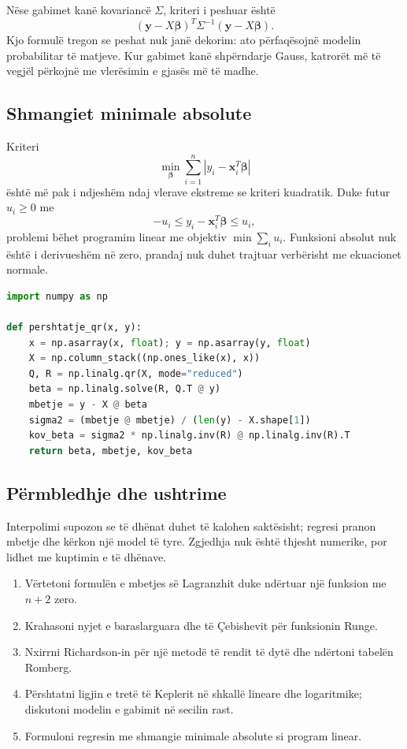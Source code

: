 \documentclass[11pt,oneside,openany]{book}
\newcommand{\vect}[1]{\bm{#1}}
\begin{document}
Nëse gabimet kanë kovariancë $\Sigma$, kriteri i peshuar është
\begin{equation}
 (\vect y-X\vect\beta)^T\Sigma^{-1}(\vect y-X\vect\beta).
\end{equation}
Kjo formulë tregon se peshat nuk janë dekorim: ato përfaqësojnë modelin probabilitar të matjeve. Kur gabimet kanë shpërndarje Gauss, katrorët më të vegjël përkojnë me vlerësimin e gjasës më të madhe.

\subsection{Shmangiet minimale absolute}
Kriteri
\begin{equation}
 \min_{\vect\beta}\sum_{i=1}^{n}|y_i-\vect x_i^T\vect\beta|
\end{equation}
është më pak i ndjeshëm ndaj vlerave ekstreme se kriteri kuadratik. Duke futur $u_i\ge0$ me
\begin{equation}
 -u_i\le y_i-\vect x_i^T\vect\beta\le u_i,
\end{equation}
problemi bëhet programim linear me objektiv $\min\sum_i u_i$. Funksioni absolut nuk është i derivueshëm në zero, prandaj nuk duhet trajtuar verbërisht me ekuacionet normale.

\begin{lstlisting}[language=Python,caption={Përshtatje lineare me QR dhe diagnostikë të mbetjeve.}]
import numpy as np

def pershtatje_qr(x, y):
    x = np.asarray(x, float); y = np.asarray(y, float)
    X = np.column_stack((np.ones_like(x), x))
    Q, R = np.linalg.qr(X, mode="reduced")
    beta = np.linalg.solve(R, Q.T @ y)
    mbetje = y - X @ beta
    sigma2 = (mbetje @ mbetje) / (len(y) - X.shape[1])
    kov_beta = sigma2 * np.linalg.inv(R) @ np.linalg.inv(R).T
    return beta, mbetje, kov_beta
\end{lstlisting}

\subsection{Përmbledhje dhe ushtrime}
Interpolimi supozon se të dhënat duhet të kalohen saktësisht; regresi pranon mbetje dhe kërkon një model të tyre. Zgjedhja nuk është thjesht numerike, por lidhet me kuptimin e të dhënave.
\begin{enumerate}
\item Vërtetoni formulën e mbetjes së Lagranzhit duke ndërtuar një funksion me $n+2$ zero.
\item Krahasoni nyjet e baraslarguara dhe të Çebishevit për funksionin Runge.
\item Nxirrni Richardson-in për një metodë të rendit të dytë dhe ndërtoni tabelën Romberg.
\item Përshtatni ligjin e tretë të Keplerit në shkallë lineare dhe logaritmike; diskutoni modelin e gabimit në secilin rast.
\item Formuloni regresin me shmangie minimale absolute si program linear.
\end{enumerate}
\end{document}
